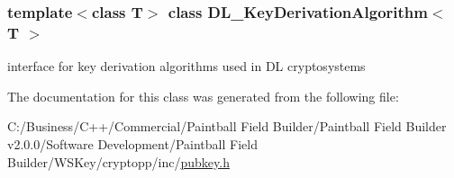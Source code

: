 \subsubsection*{template$<$class T$>$ class DL\_\-KeyDerivationAlgorithm$<$ T $>$}

interface for key derivation algorithms used in DL cryptosystems 

The documentation for this class was generated from the following file:\begin{DoxyCompactItemize}
\item 
C:/Business/C++/Commercial/Paintball Field Builder/Paintball Field Builder v2.0.0/Software Development/Paintball Field Builder/WSKey/cryptopp/inc/\hyperlink{pubkey_8h}{pubkey.h}\end{DoxyCompactItemize}
